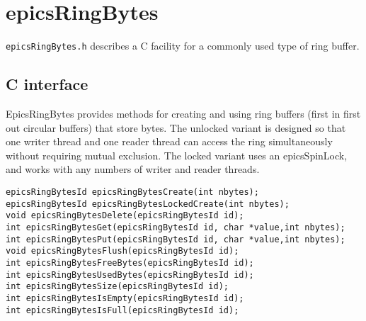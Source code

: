 

\section{epicsRingBytes}

\verb|epicsRingBytes.h| describes a C facility for a commonly used type of ring buffer.

\subsection{C interface}

EpicsRingBytes provides methods for creating and using ring buffers (first in first out circular buffers) that store bytes.
The unlocked variant is designed so that one writer thread and one reader thread can access the ring simultaneously without requiring mutual exclusion.
The locked variant uses an epicsSpinLock, and works with any numbers of writer and reader threads.

\begin{verbatim}
epicsRingBytesId epicsRingBytesCreate(int nbytes);
epicsRingBytesId epicsRingBytesLockedCreate(int nbytes);
void epicsRingBytesDelete(epicsRingBytesId id);
int epicsRingBytesGet(epicsRingBytesId id, char *value,int nbytes);
int epicsRingBytesPut(epicsRingBytesId id, char *value,int nbytes);
void epicsRingBytesFlush(epicsRingBytesId id);
int epicsRingBytesFreeBytes(epicsRingBytesId id);
int epicsRingBytesUsedBytes(epicsRingBytesId id);
int epicsRingBytesSize(epicsRingBytesId id);
int epicsRingBytesIsEmpty(epicsRingBytesId id);
int epicsRingBytesIsFull(epicsRingBytesId id);
\end{verbatim}

